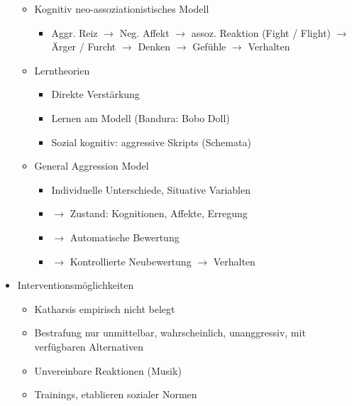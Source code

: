 \documentclass[11pt, paper=a4, twocolumn]{scrartcl}
\begin{document}
\begin{itemize}
\begin{itemize}
\begin{itemize}
						\end{itemize}
					\item Kognitiv neo-assoziationistisches Modell
						\begin{itemize}
							\item Aggr. Reiz $\rightarrow$ Neg. Affekt $\rightarrow$ assoz. Reaktion (Fight / Flight) 
								$\rightarrow$ Ärger / Furcht $\rightarrow$ Denken $\rightarrow$ Gefühle $\rightarrow$ 
								Verhalten
						\end{itemize}
					\item Lerntheorien
						\begin{itemize}
							\item Direkte Verstärkung
							\item Lernen am Modell (Bandura: Bobo Doll)
							\item Sozial kognitiv: aggressive Skripts (Schemata)
						\end{itemize}
					\item General Aggression Model
						\begin{itemize}
							\item Individuelle Unterschiede, Situative Variablen
							\item $\rightarrow$ Zustand: Kognitionen, Affekte, Erregung
							\item $\rightarrow$ Automatische Bewertung
							\item $\rightarrow$ Kontrollierte Neubewertung $\rightarrow$ Verhalten
						\end{itemize}
				\end{itemize}
			\item Interventionsmöglichkeiten
				\begin{itemize}
					\item Katharsis empirisch nicht belegt
					\item Bestrafung nur unmittelbar, wahrscheinlich, unanggressiv, mit verfügbaren Alternativen
					\item Unvereinbare Reaktionen (Musik)
					\item Trainings, etablieren sozialer Normen
				\end{itemize}
		\end{itemize}
\end{document}
